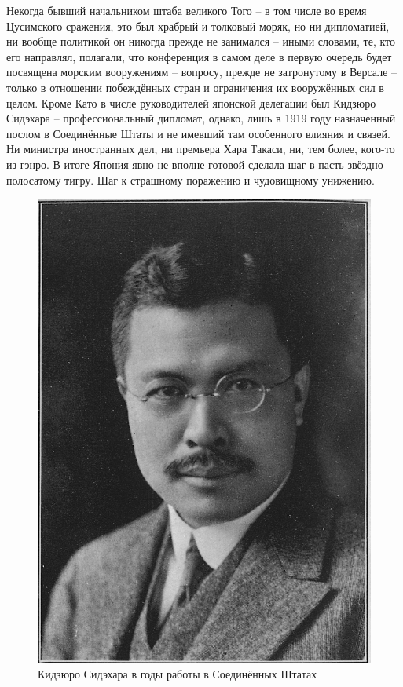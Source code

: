 Некогда бывший начальником штаба великого Того – в том числе во время Цусимского сражения, это был храбрый и толковый моряк, но ни дипломатией, ни вообще политикой он никогда прежде не занимался – иными словами, те, кто его направлял, полагали, что конференция в самом деле в первую очередь будет посвящена морским вооружениям – вопросу, прежде не затронутому в Версале – только в отношении побеждённых стран и ограничения их вооружённых сил в целом. Кроме Като в числе руководителей японской делегации был Кидзюро Сидэхара – профессиональный дипломат, однако, лишь в 1919 году назначенный послом в Соединённые Штаты и не имевший там особенного влияния и связей. Ни министра иностранных дел, ни премьера Хара Такаси, ни, тем более, кого-то из гэнро. В итоге Япония явно не вполне готовой сделала шаг в пасть звёздно-полосатому тигру. Шаг к страшному поражению и чудовищному унижению.

\begin{figure}[h!tb] 
	\centering\includegraphics[scale=0.7]{Glava6/tX8KCIWX7IM.jpg}
	\caption{Кидзюро Сидэхара в годы работы в Соединённых Штатах}%
\end{figure}

